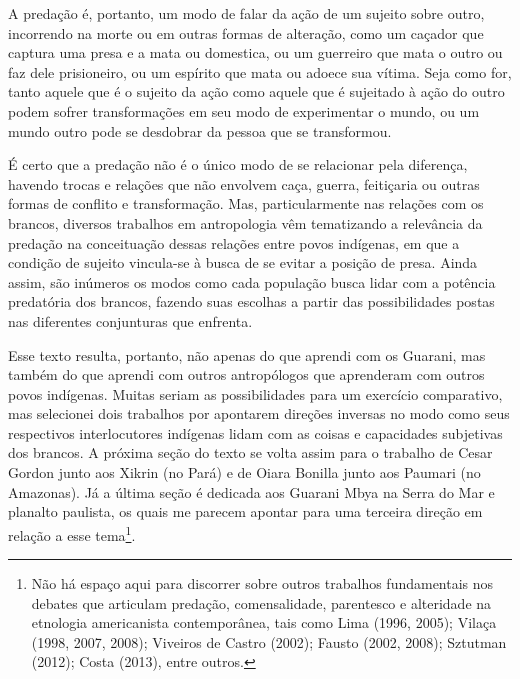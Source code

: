 {A predação é, portanto, um modo de falar da ação de um sujeito sobre
outro, incorrendo na morte ou em outras formas de alteração, como um
caçador que captura uma presa e a mata ou domestica, ou um guerreiro
que mata o outro ou faz dele prisioneiro, ou um espírito que mata ou
adoece sua vítima. Seja como for, tanto aquele que é o sujeito da ação
como aquele que é sujeitado à ação do outro podem sofrer transformações
em seu modo de experimentar o mundo, ou um mundo outro pode se
desdobrar da pessoa que se transformou.

É certo que a predação não é o único modo de se relacionar pela
diferença, havendo trocas e relações que não envolvem caça, guerra,
feitiçaria ou outras formas de conflito e transformação. Mas,
particularmente nas relações com os brancos, diversos trabalhos em
antropologia vêm tematizando a relevância da predação na conceituação
dessas relações entre povos indígenas, em que a condição de sujeito
vincula-se à busca de se evitar a posição de presa. Ainda assim, são
inúmeros os modos como cada população busca lidar com a potência
predatória dos brancos, fazendo suas escolhas a partir das
possibilidades postas nas diferentes conjunturas que enfrenta.

Esse texto resulta, portanto, não apenas do que aprendi com os Guarani,
mas também do que aprendi com outros antropólogos que aprenderam com
outros povos indígenas. Muitas seriam as possibilidades para um
exercício comparativo, mas selecionei dois trabalhos por apontarem
direções inversas no modo como seus respectivos interlocutores
indígenas lidam com as coisas e capacidades subjetivas dos brancos. A
próxima seção do texto se volta assim para o trabalho de Cesar Gordon
junto aos Xikrin (no Pará) e de Oiara Bonilla junto aos Paumari (no
Amazonas). Já a última seção é dedicada aos Guarani Mbya na Serra do
Mar e planalto paulista, os quais me parecem apontar para uma terceira
direção em relação a esse tema\footnote{Não há espaço aqui para
discorrer sobre outros trabalhos fundamentais nos debates que articulam
predação, comensalidade, parentesco e alteridade na etnologia
americanista contemporânea, tais como Lima (1996, 2005); Vilaça (1998,
2007, 2008); Viveiros de Castro (2002); Fausto (2002, 2008); Sztutman
(2012); Costa (2013), entre outros.}. 

}
